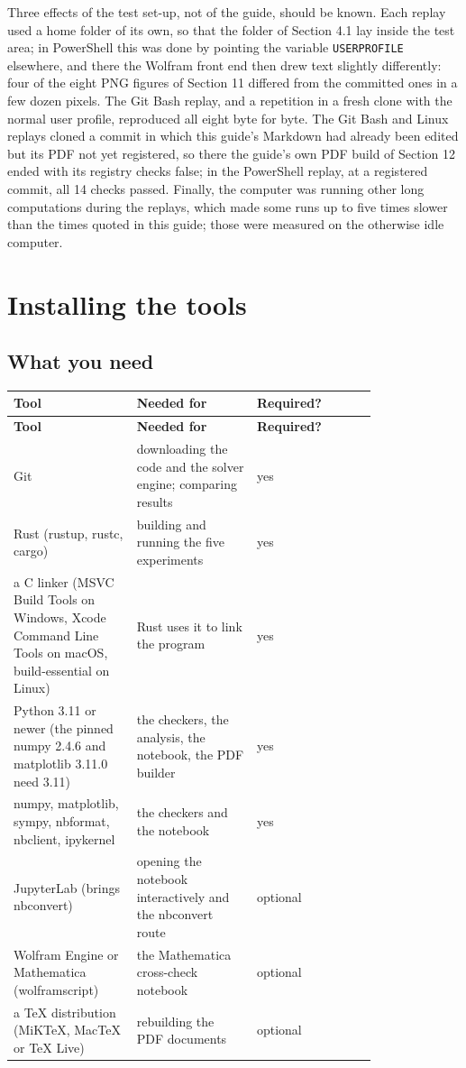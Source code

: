 \documentclass[11pt]{article}
\begin{document}
Three effects of the test set-up, not of the guide, should be known. Each replay used a home folder of its own, so that the folder \texttt{} of Section 4.1 lay inside the test area; in PowerShell this was done by pointing the variable \texttt{USERPROF\allowbreak{}ILE} elsewhere, and there the Wolfram front end then drew text slightly differently: four of the eight PNG figures of Section 11 differed from the committed ones in a few dozen pixels. The Git Bash replay, and a repetition in a fresh clone with the normal user profile, reproduced all eight byte for byte. The Git Bash and Linux replays cloned a commit in which this guide's Markdown had already been edited but its PDF not yet registered, so there the guide's own PDF build of Section 12 ended with its registry checks false; in the PowerShell replay, at a registered commit, all 14 checks passed. Finally, the computer was running other long computations during the replays, which made some runs up to five times slower than the times quoted in this guide; those were measured on the otherwise idle computer.

\section{Installing the tools}

\subsection{What you need}

\begingroup
\small
\begin{longtable}{@{}>{\raggedright\arraybackslash}p{0.267\linewidth}>{\raggedright\arraybackslash}p{0.267\linewidth}>{\raggedright\arraybackslash}p{0.267\linewidth}@{}}
\toprule
\textbf{Tool} & \textbf{Needed for} & \textbf{Required?} \\
\midrule
\endfirsthead
\toprule
\textbf{Tool} & \textbf{Needed for} & \textbf{Required?} \\
\midrule
\endhead
Git & downloading the code and the solver engine; comparing results & yes \\
Rust (rustup, rustc, cargo) & building and running the five experiments & yes \\
a C linker (MSVC Build Tools on Windows, Xcode Command Line Tools on macOS, build-essential on Linux) & Rust uses it to link the program & yes \\
Python 3.11 or newer (the pinned numpy 2.4.6 and matplotlib 3.11.0 need 3.11) & the checkers, the analysis, the notebook, the PDF builder & yes \\
numpy, matplotlib, sympy, nbformat, nbclient, ipykernel & the checkers and the notebook & yes \\
JupyterLab (brings nbconvert) & opening the notebook interactively and the nbconvert route & optional \\
Wolfram Engine or Mathematica (wolframscript) & the Mathematica cross-check notebook & optional \\
a TeX distribution (MiKTeX, MacTeX or TeX Live) & rebuilding the PDF documents & optional \\
\bottomrule
\end{longtable}
\endgroup
\end{document}
